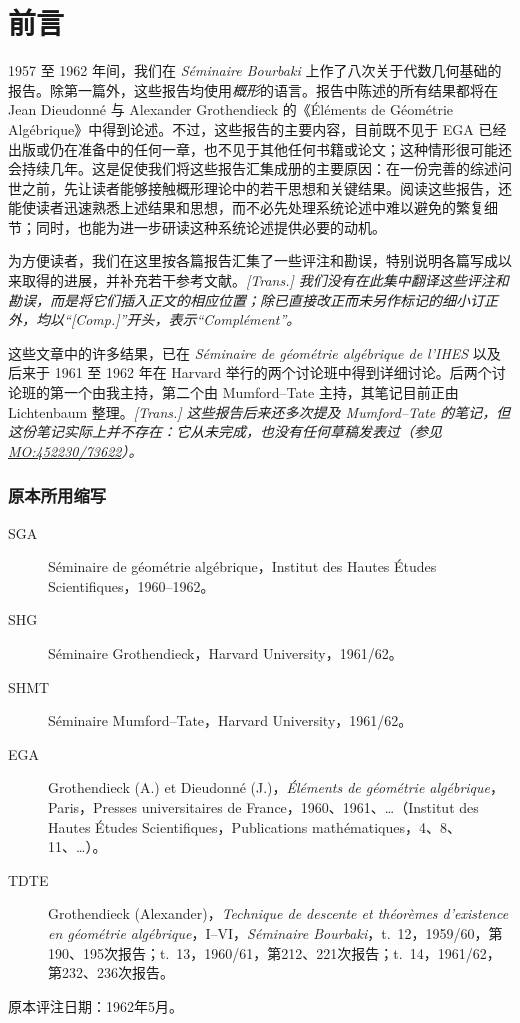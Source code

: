 \part{前言}\label{fga-foreword}\thispagestyle{fancy}\par{}1957 至 1962 年间，我们在 \emph{Séminaire Bourbaki} 上作了八次关于代数几何基础的报告。除第一篇外，这些报告均使用\emph{概形}的语言。报告中陈述的所有结果都将在 Jean Dieudonné 与 Alexander Grothendieck 的《Éléments de Géométrie Algébrique》中得到论述。不过，这些报告的主要内容，目前既不见于 EGA 已经出版或仍在准备中的任何一章，也不见于其他任何书籍或论文；这种情形很可能还会持续几年。这是促使我们将这些报告汇集成册的主要原因：在一份完善的综述问世之前，先让读者能够接触概形理论中的若干思想和关键结果。阅读这些报告，还能使读者迅速熟悉上述结果和思想，而不必先处理系统论述中难以避免的繁复细节；同时，也能为进一步研读这种系统论述提供必要的动机。\par{}为方便读者，我们在这里按各篇报告汇集了一些评注和勘误，特别说明各篇写成以来取得的进展，并补充若干参考文献。\emph{[Trans.] 我们没有在此集中翻译这些评注和勘误，而是将它们插入正文的相应位置；除已直接改正而未另作标记的细小订正外，均以“\emph{[Comp.]}”开头，表示“Complément”。}\par{}这些文章中的许多结果，已在 \emph{Séminaire de géométrie algébrique de l’IHES} 以及后来于 1961 至 1962 年在 Harvard 举行的两个讨论班中得到详细讨论。后两个讨论班的第一个由我主持，第二个由 Mumford–Tate 主持，其笔记目前正由 Lichtenbaum 整理。\emph{[Trans.] 这些报告后来还多次提及 Mumford–Tate 的笔记，但这份笔记实际上并不存在：它从未完成，也没有任何草稿发表过（参见 \href{https://mathoverflow.net/a/452230/73622}{MO:452230/73622}）。}

\section*{原本所用缩写}
\begin{description}
\item[SGA] Séminaire de géométrie algébrique，Institut des Hautes Études Scientifiques，1960--1962。
\item[SHG] Séminaire Grothendieck，Harvard University，1961/62。
\item[SHMT] Séminaire Mumford--Tate，Harvard University，1961/62。
\item[EGA] Grothendieck (A.) et Dieudonné (J.)，\emph{Éléments de géométrie algébrique}，Paris，Presses universitaires de France，1960、1961、\ldots（Institut des Hautes Études Scientifiques，Publications mathématiques，4、8、11、\ldots）。
\item[TDTE] Grothendieck (Alexander)，\emph{Technique de descente et théorèmes d’existence en géométrie algébrique}，I--VI，\emph{Séminaire Bourbaki}，t.~12，1959/60，第190、195次报告；t.~13，1960/61，第212、221次报告；t.~14，1961/62，第232、236次报告。
\end{description}
\begin{flushright}原本评注日期：1962年5月。\end{flushright}
